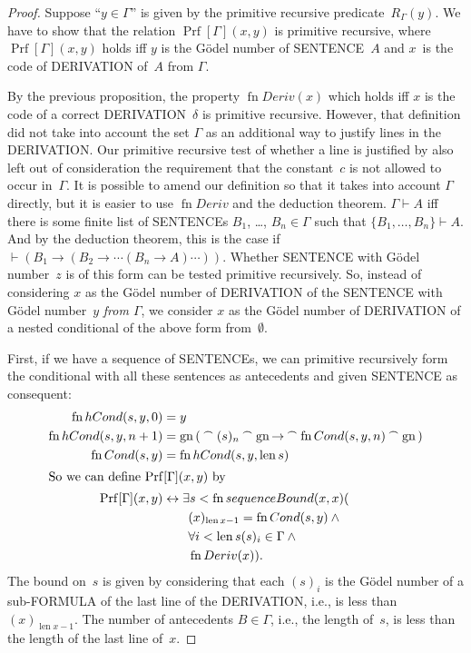 \documentclass[10pt,a4paper]{article}
\newcommand*{\olup}[1]{\MakeUppercase{#1}}
\theoremstyle{plain}
\theoremstyle{definition}
\theoremstyle{remark}
\providecommand{\lif}{\mathbin{\rightarrow}}
\providecommand{\Proves}{\mathrel{\vdash}}
\providecommand{\len}{\operatorname{len}}
\providecommand{\concat}{\mathbin{{}^\frown}}
\providecommand{\Prf}{\operatorname{Prf}}
\providecommand{\Gn}{\operatorname{gn}}
\providecommand{\bforall}{\forall}
\providecommand{\bexists}{\exists}
\providecommand{\QR}{\mathrm{QR}}
\providecommand{\defiff}{\mathrel{\leftrightarrow}}
\providecommand{\fn}{\operatorname{fn}}
\begin{document}
\begin{proof}
Suppose ``$y \in \Gamma$'' is given by the primitive recursive
predicate~$R_\Gamma(y)$.  We have to show that the relation
$\Prf[\Gamma](x, y)$ is primitive recursive, where $\Prf[\Gamma](x,
y)$ holds iff $y$ is the G\"odel number of \olup{sentence}~$A$ and
$x$~is the code of \olup{derivation} of~$A$ from $\Gamma$.

By the previous proposition, the property $\fn{Deriv}(x)$ which holds
iff $x$ is the code of a correct \olup{derivation}~$\delta$ is primitive
recursive. However, that definition did not take into account the set
$\Gamma$ as an additional way to justify lines in the \olup{derivation}. Our
primitive recursive test of whether a line is justified by \QR{} also
left out of consideration the requirement that the constant~$c$ is not
allowed to occur in~$\Gamma$. It is possible to amend our definition so
that it takes into account $\Gamma$ directly, but it is easier to use
$\fn{Deriv}$ and the deduction theorem. $\Gamma \Proves A$ iff
there is some finite list of \olup{sentence}s $B_1$, \dots, $B_n \in
\Gamma$ such that $\{B_1, \dots, B_n\} \Proves A$. And by the
deduction theorem, this is the case if $\Proves (B_1 \lif (B_2 \lif
\cdots (B_n \lif A)\cdots))$. Whether \olup{sentence} with G\"odel
number~$z$ is of this form can be tested primitive recursively.  So,
instead of considering $x$ as the G\"odel number of \olup{derivation} of
the \olup{sentence} with G\"odel number~$y$ \emph{from $\Gamma$}, we consider
$x$ as the G\"odel number of \olup{derivation} of a nested conditional
of the above form from~$\emptyset$.

First, if we have a sequence of \olup{sentence}s, we can primitive
recursively form the conditional with all these sentences as
antecedents and given \olup{sentence} as consequent:
\begin{align*}
  \fn{hCond}(s, y, 0) & = y \\
  \fn{hCond}(s, y, n+1) & = \Gn{(} \concat (s)_{n} \concat \Gn{\lif}
  \concat \fn{Cond}(s, y, n) \concat \Gn{)}\\
  \fn{Cond}(s, y) & = \fn{hCond}(s, y, \len{s})\\
  \intertext{So we can define $\Prf[\Gamma](x, y)$ by}
  \Prf[\Gamma](x, y) & \defiff \bexists{s < \fn{sequenceBound}(x,x)}{(} \\
  &\qquad (x)_{\len{x}-1} = \fn{Cond}(s,y) \land {} \\
  &\qquad\bforall{i<\len{s}}{(s)_i \in \Gamma} \land {} \\
  &\qquad\fn{Deriv}(x)).
\end{align*}
The bound on~$s$ is given by considering that each $(s)_i$ is the
G\"odel number of a sub-\olup{formula} of the last line of the \olup{derivation},
i.e., is less than $(x)_{\len{x}-1}$. The number of antecedents $B
\in \Gamma$, i.e., the length of~$s$, is less than the length of the
last line of~$x$.
\end{proof}
\end{document}
